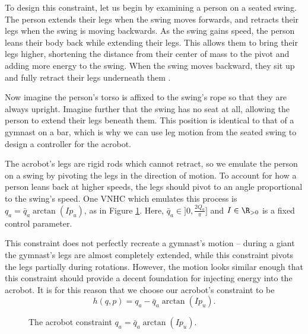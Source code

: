 To design this constraint, let us begin by examining a person on a seated swing.
The person extends their legs when the swing moves forwards, and retracts their
legs when the swing is moving backwards.
As the swing gains speed, the person leans their body back while
extending their legs.
This allows them to bring their legs higher, shortening the distance
from their center of mass to the pivot and adding more energy to the swing.
When the swing moves backward, they sit up and fully retract their legs
underneath them \cite{how_to_pump_a_swing}.

Now imagine the person's torso is affixed to the swing's rope so that they are
always upright. 
Imagine further that the swing has no seat at all, allowing the person to extend
their legs beneath them. 
This position is identical to that of a gymnast on a bar, which is why we can
use leg motion from the seated swing to design a controller for the acrobot.

The acrobot's legs are rigid rods which cannot retract, so we emulate the person
on a swing by pivoting the legs in the direction of motion. 
To account for how a person leans back at higher speeds, the legs should pivot to an
angle proportional to the swing's speed.
One VNHC which emulates this process is \(q_a = \bar{q}_a\arctan( I p_u)\), as
in Figure \ref{fig:qa-arctan}.
Here, \(\bar{q}_a \in ]0,\frac{2 Q_a}{\pi}]\)
and \(I \in \R_{>0}\) is a fixed control parameter.

This constraint does not perfectly recreate a gymnast's motion -- during
a giant the gymnast's legs are almost completely extended, while this constraint
pivots the legs partially during rotations.
However, the motion looks similar enough that this constraint should provide a
decent foundation for injecting energy into the acrobot.
It is for this reason that we choose our acrobot's constraint to be
\begin{equation}\label{eqn:acrobot-constraint}
    h(q,p) = q_a - \bar{q}_a \arctan(I p_u)
    .
\end{equation}

\begin{figure}
    \centering
    
    \caption{The acrobot constraint \(q_a = \bar{q}_a \arctan(I p_u)\).}
    \label{fig:qa-arctan}
\end{figure}

